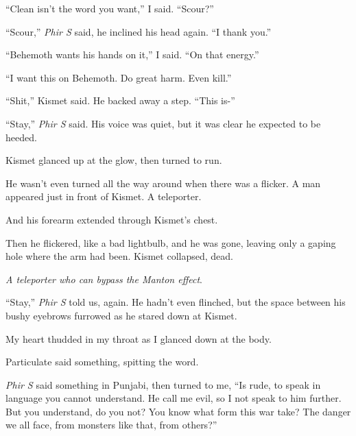 ``Clean isn't the word you want,'' I said. ``Scour?''



``Scour,'' \emph{Phir S} said, he inclined his head again.  ``I thank you.''



``Behemoth wants his hands on it,'' I said.  ``On that energy.''



``I want this on Behemoth.  Do great harm.  Even kill.''



``Shit,'' Kismet said.  He backed away a step.  ``This is-''



``Stay,'' \emph{Phir S} said.  His voice was quiet, but it was clear he expected to be heeded.



Kismet glanced up at the glow, then turned to run.



He wasn't even turned all the way around when there was a flicker.  A man appeared just in front of Kismet.  A teleporter.



And his forearm extended through Kismet's chest.



Then he flickered, like a bad lightbulb, and he was gone, leaving only a gaping hole where the arm had been.  Kismet collapsed, dead.



\emph{A teleporter who can bypass the Manton effect}.



``Stay,'' \emph{Phir S} told us, again.  He hadn't even flinched, but the space between his bushy eyebrows furrowed as he stared down at Kismet.



My heart thudded in my throat as I glanced down at the body.



Particulate said something, spitting the word.



\emph{Phir S} said something in Punjabi, then turned to me, ``Is rude, to speak in language you cannot understand.  He call me evil, so I not speak to him further.  But you understand, do you not?  You know what form this war take?  The danger we all face, from monsters like that, from others?''



